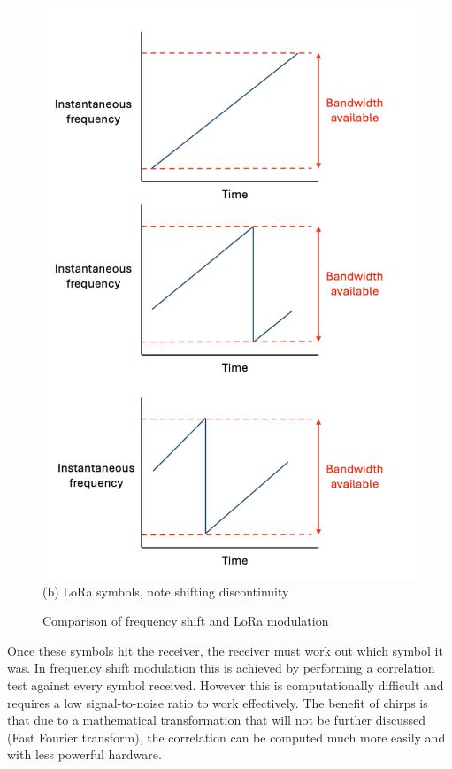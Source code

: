 \begin{figure}[H]
\begin{minipage}{0.48\textwidth}
    \includegraphics[width=0.9\linewidth]{contents/part-1/fig1/lora-wavechart.png}
    \\[4pt]
    {\small (b) LoRa symbols, note shifting discontinuity}
  \end{minipage}
  \caption{ Comparison of frequency shift and LoRa modulation }
  \label{fig:freq-vs-lora}
\end{figure}

Once these symbols hit the receiver, the receiver must work out which symbol it
was. In frequency shift modulation this is achieved by performing a correlation
test against every symbol received. However this is computationally difficult
and requires a low signal-to-noise ratio to work effectively. The benefit of
chirps is that due to a mathematical transformation that will not be further
discussed (Fast Fourier transform), the correlation can be computed much more
easily and with less powerful hardware.


